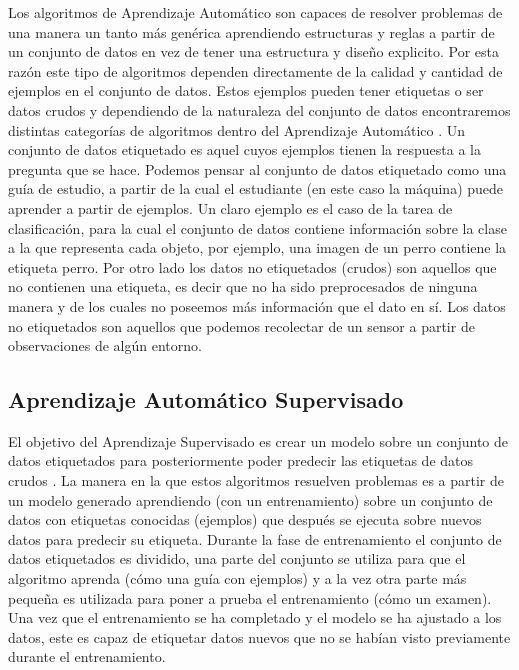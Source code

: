 Los algoritmos de Aprendizaje Automático son capaces de resolver problemas de una manera un tanto más genérica aprendiendo estructuras y reglas a partir de un conjunto de datos en vez de tener una estructura y diseño explicito. Por esta razón este tipo de algoritmos dependen directamente de la calidad y cantidad de ejemplos en el conjunto de datos. Estos ejemplos pueden tener etiquetas o ser datos crudos y dependiendo de la naturaleza del conjunto de datos encontraremos distintas categorías de algoritmos dentro del Aprendizaje Automático \cite{rebala_introduction_2019}. Un conjunto de datos etiquetado es aquel cuyos ejemplos tienen la respuesta a la pregunta que se hace. Podemos pensar al conjunto de datos etiquetado como una guía de estudio, a partir de la cual el estudiante (en este caso la máquina) puede aprender a partir de ejemplos. Un claro ejemplo es el caso de la tarea de clasificación, para la cual el conjunto de datos contiene información sobre la clase a la que representa cada objeto, por ejemplo, una imagen de un perro contiene la etiqueta perro. Por otro lado los datos no etiquetados (crudos) son aquellos que no contienen una etiqueta, es decir que no ha sido preprocesados de ninguna manera y de los cuales no poseemos más información que el dato en sí. Los datos no etiquetados son aquellos que podemos recolectar de un sensor a partir de observaciones de algún entorno.

\subsection{Aprendizaje Automático Supervisado}

El objetivo del Aprendizaje Supervisado es crear un modelo sobre un conjunto de datos etiquetados para posteriormente poder predecir las etiquetas de datos crudos \cite{rebala_introduction_2019}. La manera en la que estos algoritmos resuelven problemas es a partir de un modelo generado aprendiendo (con un entrenamiento) sobre un conjunto de datos con etiquetas conocidas (ejemplos) que después se ejecuta sobre nuevos datos para predecir su etiqueta. Durante la fase de entrenamiento el conjunto de datos etiquetados es dividido, una parte del conjunto se utiliza para que el algoritmo aprenda (cómo una guía con ejemplos) y a la vez otra parte más pequeña es utilizada para poner a prueba el entrenamiento (cómo un examen). Una vez que el entrenamiento se ha completado y el modelo se ha ajustado a los datos, este es capaz de etiquetar datos nuevos que no se habían visto previamente durante el entrenamiento. 

